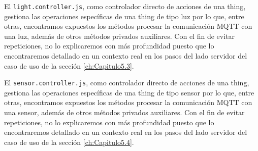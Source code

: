 El \verb|light.controller.js|, como controlador directo de acciones de una thing, gestiona las operaciones específicas de una thing de tipo luz por lo que, entre otras, encontramos expuestos los métodos procesar la comunicación MQTT con una luz, además de otros métodos privados auxiliares. Con el fin de evitar repeticiones, no lo explicaremos con más profundidad puesto que lo encontraremos detallado en un contexto real en los pasos del lado servidor del caso de uso de la sección \ref{ch:Capitulo5.3}.

\vspace{1cm}

El \verb|sensor.controller.js|, como controlador directo de acciones de una thing, gestiona las operaciones específicas de una thing de tipo sensor por lo que, entre otras, encontramos expuestos los métodos procesar la comunicación MQTT con una sensor, además de otros métodos privados auxiliares. Con el fin de evitar repeticiones, no lo explicaremos con más profundidad puesto que lo encontraremos detallado en un contexto real en los pasos del lado servidor del caso de uso de la sección \ref{ch:Capitulo5.4}.

\vspace{1cm}

